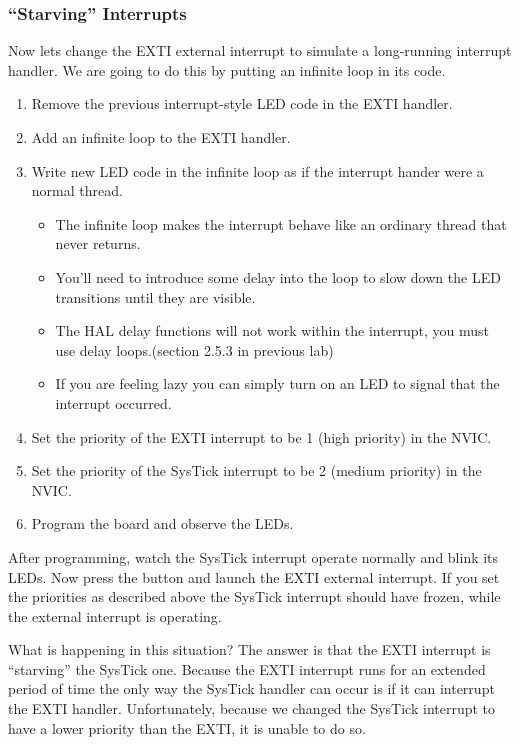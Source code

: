 \documentclass[11pt,fleqn]{book} %
\begin{document}
\subsubsection{``Starving'' Interrupts}
Now lets change the EXTI external interrupt to simulate a long-running interrupt handler. We are going to do this by putting an infinite loop in its code. 

\begin{enumerate}
    \item Remove the previous interrupt-style LED code in the EXTI handler.
    \item Add an infinite loop to the EXTI handler.
    \item Write new LED code in the infinite loop as if the interrupt hander were a normal thread.
    \begin{itemize}
        \item The infinite loop makes the interrupt behave like an ordinary thread that never returns.
        \item You'll need to introduce some delay into the loop to slow down the LED transitions until they are visible.
        \item The HAL delay functions will not work within the interrupt, you must use delay loops.(section 2.5.3 in previous lab)
        \item If you are feeling lazy you can simply turn on an LED to signal that the interrupt occurred.
    \end{itemize}
    \item Set the priority of the EXTI interrupt to be 1 (high priority) in the NVIC.
    \item Set the priority of the SysTick interrupt to be 2 (medium priority) in the NVIC.
    \item Program the board and observe the LEDs.
\end{enumerate}

After programming, watch the SysTick interrupt operate normally and blink its LEDs. Now press the button and launch the EXTI external interrupt. If you set the priorities as described above the SysTick interrupt should have frozen, while the external interrupt is operating. 

What is happening in this situation? The answer is that the EXTI interrupt is ``starving'' the SysTick one. Because the EXTI interrupt runs for an extended period of time the only way the SysTick handler can occur is if it can interrupt the EXTI handler. Unfortunately, because we changed the SysTick interrupt to have a lower priority than the EXTI, it is unable to do so.
\end{document}
